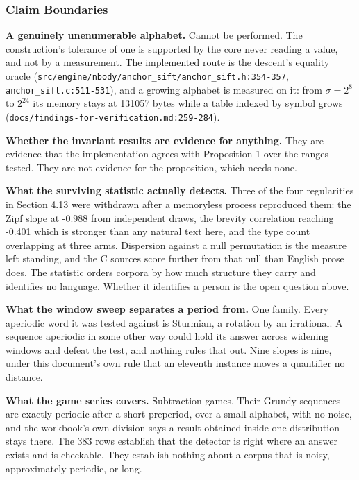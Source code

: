 \subsubsection{Claim Boundaries}

\textbf{A genuinely unenumerable alphabet.} Cannot be performed. The construction's tolerance of one is supported by the core never reading a value, and not by a measurement. The implemented route is the descent's equality oracle (\texttt{src/\allowbreak{}engine/\allowbreak{}nbody/\allowbreak{}anchor\_sift/\allowbreak{}anchor\_sift.h:354-357}, \texttt{anchor\_sift.c:511-531}), and a growing alphabet is measured on it: from \(\sigma = 2^8\) to \(2^{24}\) its memory stays at 131057 bytes while a table indexed by symbol grows (\texttt{docs/\allowbreak{}findings-\allowbreak{}for-\allowbreak{}verification.md:259-284}).

\textbf{Whether the invariant results are evidence for anything.} They are evidence that the implementation agrees with Proposition 1 over the ranges tested. They are not evidence for the proposition, which needs none.

\textbf{What the surviving statistic actually detects.} Three of the four regularities in Section 4.13 were withdrawn after a memoryless process reproduced them: the Zipf slope at -0.988 from independent draws, the brevity correlation reaching -0.401 which is stronger than any natural text here, and the type count overlapping at three arms. Dispersion against a null permutation is the measure left standing, and the C sources score further from that null than English prose does. The statistic orders corpora by how much structure they carry and identifies no language. Whether it identifies a person is the open question above.

\textbf{What the window sweep separates a period from.} One family. Every aperiodic word it was tested against is Sturmian, a rotation by an irrational. A sequence aperiodic in some other way could hold its answer across widening windows and defeat the test, and nothing rules that out. Nine slopes is nine, under this document's own rule that an eleventh instance moves a quantifier no distance.

\textbf{What the game series covers.} Subtraction games. Their Grundy sequences are exactly periodic after a short preperiod, over a small alphabet, with no noise, and the workbook's own division says a result obtained inside one distribution stays there. The 383 rows establish that the detector is right where an answer exists and is checkable. They establish nothing about a corpus that is noisy, approximately periodic, or long.

